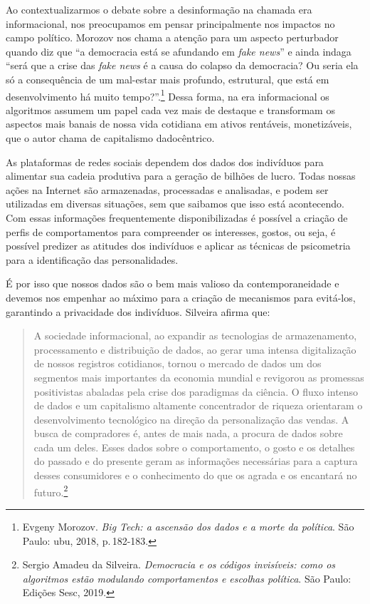 Ao contextualizarmos o debate sobre a desinformação na chamada era
informacional, nos preocupamos em pensar principalmente nos impactos no
campo político. Morozov nos chama a atenção para um aspecto perturbador
quando diz que ``a democracia está se afundando em \textit{fake news}'' e ainda indaga ``será que a crise das \textit{fake news} é
a causa do colapso da democracia? Ou seria ela só a consequência de um
mal-estar mais profundo, estrutural, que está em desenvolvimento há
muito tempo?''.\footnote{Evgeny Morozov. \textit{Big Tech: a ascensão dos dados e a
morte da política}. São Paulo: ubu, 2018, p.\,182-183.} Dessa forma, na era
informacional os algoritmos assumem um papel cada vez mais de destaque e
transformam os aspectos mais banais de nossa vida cotidiana em ativos
rentáveis, monetizáveis, que o autor chama de capitalismo dadocêntrico.

As plataformas de redes sociais dependem dos dados dos indivíduos para
alimentar sua cadeia produtiva para a geração de bilhões de lucro. Todas 
nossas ações na Internet são armazenadas, processadas e analisadas, e
podem ser utilizadas em diversas situações, sem que saibamos que isso
está acontecendo. Com essas informações frequentemente disponibilizadas
é possível a criação de perfis de comportamentos para compreender os
interesses, gostos, ou seja, é possível predizer as atitudes dos
indivíduos e aplicar as técnicas de psicometria para a identificação das
personalidades.

É por isso que nossos dados são o bem mais valioso da contemporaneidade
e devemos nos empenhar ao máximo para a criação de mecanismos para
evitá-los, garantindo a privacidade dos indivíduos. Silveira
afirma que:

\begin{quote}
A sociedade informacional, ao expandir as tecnologias de armazenamento,
processamento e distribuição de dados, ao gerar uma intensa
digitalização de nossos registros cotidianos, tornou o mercado de dados
um dos segmentos mais importantes da economia mundial e revigorou as
promessas positivistas abaladas pela crise dos paradigmas da ciência. O
fluxo intenso de dados e um capitalismo altamente concentrador de
riqueza orientaram o desenvolvimento tecnológico na direção da
personalização das vendas. A busca de compradores é, antes de mais nada,
a procura de dados sobre cada um deles. Esses dados sobre o
comportamento, o gosto e os detalhes do passado e do presente geram as
informações necessárias para a captura desses consumidores e o
conhecimento do que os agrada e os encantará no futuro.\footnote{Sergio Amadeu da Silveira. \textit{Democracia e os códigos
invisíveis: como os algoritmos estão modulando comportamentos e escolhas
política}. São Paulo: Edições Sesc, 2019.}
\end{quote}

